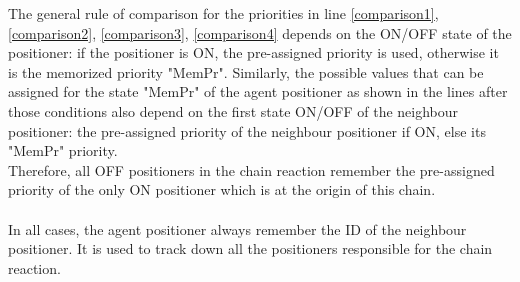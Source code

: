 \documentclass[]{spie}  %
\begin{document}
	The general rule of comparison for the priorities in line \ref{comparison1}, \ref{comparison2}, \ref{comparison3}, \ref{comparison4} depends on the ON/OFF state of the positioner: if the positioner is ON, the pre-assigned priority is used, otherwise it is the memorized priority "MemPr". Similarly, the possible values that can be assigned for the state "MemPr" of the agent positioner as shown in the lines after those conditions also depend on the first state ON/OFF of the neighbour positioner: the pre-assigned priority of the neighbour positioner if ON, else its "MemPr" priority.\\
	Therefore, all OFF positioners in the chain reaction remember the pre-assigned priority of the only ON positioner which is at the origin of this chain.\\\\	
	In all cases, the agent positioner always remember the ID of the neighbour positioner. It is used to track down all the positioners responsible for the chain reaction.   
\end{document}
